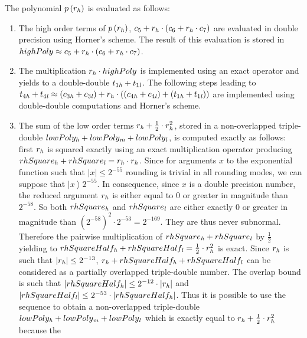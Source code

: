 The polynomial $p\left( r_{\mathit{h}} \right)$ is evaluated as follows:
\begin{enumerate}
\item The high order terms of $p\left( r_{\mathit{h}} \right)$, $c_5 + r_{\mathit{h}}
\cdot \left( c_6 + r_{\mathit{h}} \cdot c_7 \right)$ are evaluated in double
precision using Horner's scheme.  The result of this evaluation is
stored in $highPoly \approx c_5 + r_{\mathit{h}} \cdot \left( c_6 + r_{\mathit{h}} \cdot
c_7 \right)$.
\item The multiplication $r_{\mathit{h}} \cdot highPoly$ is implemented using
an exact operator and yields to a double-double $t_{1\mathit{h}} +
t_{1\mathit{l}}$. The following steps leading to $t_{4\mathit{h}} + t_{4\mathit{l}} \approx
\left( c_{3\mathit{h}} + c_{3\mathit{l}} \right) + r_{\mathit{h}} \cdot \left( \left(
c_{4\mathit{h}} + c_{4\mathit{l}} \right) + \left( t_{1\mathit{h}} + t_{1\mathit{l}} \right)
\right)$ are implemented using double-double computations and Horner's
scheme.
\item The sum of the low order terms $r_{\mathit{h}} + \frac{1}{2} \cdot
r_{\mathit{h}}^2$, stored in a non-overlapped triple-double $lowPoly_{\mathit{h}} +
lowPoly_{\mathit{m}} + lowPoly_{\mathit{l}}$, is computed exactly as follows: first
$r_{\mathit{h}}$ is squared exactly using an exact multiplication operator
producing $rhSquare_{\mathit{h}} + rhSquare_{\mathit{l}} = r_{\mathit{h}} \cdot r_{\mathit{h}}$. Since for
arguments $x$ to the exponential function such that $\left \vert x
\right \vert \leq 2^{-55}$ rounding is trivial in all rounding modes,
we can suppose that $\left \vert x \right > 2^{-55}$. In consequence,
since $x$ is a double precision number, the reduced argument $r_{\mathit{h}}$
is either equal to $0$ or greater in magnitude than $2^{-58}$. So both
$rhSquare_{\mathit{h}}$ and $rhSquare_{\mathit{l}}$ are either exactly $0$ or greater in
magnitude than $\left( 2^{-58} \right)^2 \cdot 2^{-53} =
2^{-169}$. They are thus never subnormal.  Therefore the pairwise
multiplication of $rhSquare_{\mathit{h}} + rhSquare_{\mathit{l}}$ by $\frac{1}{2}$
yielding to $rhSquareHalf_{\mathit{h}} + rhSquareHalf_{\mathit{l}} = \frac{1}{2} \cdot
r_{\mathit{h}}^2$ is exact. Since $r_{\mathit{h}}$ is such that $\left \vert r_{\mathit{h}}
\right \vert \leq 2^{-13}$, $r_{\mathit{h}} + rhSquareHalf_{\mathit{h}} +
rhSquareHalf_{\mathit{l}}$ can be considered as a partially overlapped
triple-double number. The overlap bound is such that $\left \vert
rhSquareHalf_{\mathit{h}} \right \vert \leq 2^{-12} \cdot \left \vert r_{\mathit{h}}
\right \vert$ and $\left \vert rhSquareHalf_{\mathit{l}} \right \vert \leq
2^{-53} \cdot \left \vert rhSquareHalf_{\mathit{h}} \right \vert$.  Thus it is
possible to use the \Renormalize~ sequence
\cite{Lauter2005LIP:tripledouble} to obtain a non-overlapped
triple-double $lowPoly_{\mathit{h}} + lowPoly_{\mathit{m}} + lowPoly_{\mathit{l}}$ which is
exactly equal to $r_{\mathit{h}} + \frac{1}{2} \cdot r_{\mathit{h}}^2$ because the

\end{enumerate}
